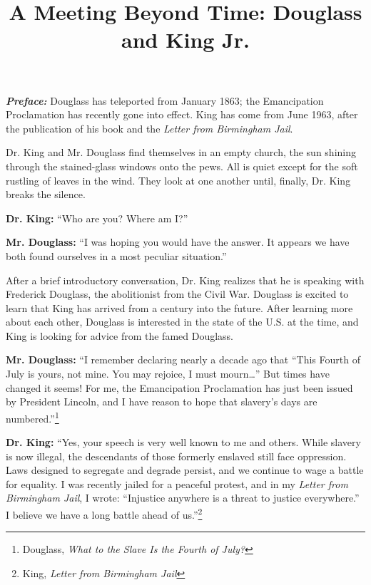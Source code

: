 \documentclass[12pt]{article}
\title{A Meeting Beyond Time: Douglass and King Jr.}
\author{}
\date{}
\begin{document}
\maketitle
\onehalfspacing

\textbf{\textit{Preface:}} Douglass has teleported from January 1863; the Emancipation Proclamation has recently gone into effect. King has come from June 1963, after the publication of his book and the \textit{Letter from Birmingham Jail}.

\bigskip

\indent Dr. King and Mr. Douglass find themselves in an empty church, the sun shining through the stained-glass windows onto the pews. All is quiet except for the soft rustling of leaves in the wind. They look at one another until, finally, Dr. King breaks the silence.

\bigskip

\textbf{Dr. King:} “Who are you? Where am I?”

\textbf{Mr. Douglass:} “I was hoping you would have the answer. It appears we have both found ourselves in a most peculiar situation.”

\bigskip

After a brief introductory conversation, Dr. King realizes that he is speaking with Frederick Douglass, the abolitionist from the Civil War. Douglass is excited to learn that King has arrived from a century into the future. After learning more about each other, Douglass is interested in the state of the U.S. at the time, and King is looking for advice from the famed Douglass.

\bigskip

\textbf{Mr. Douglass:} “I remember declaring nearly a decade ago that \enquote{This Fourth of July is yours, not mine. You may rejoice, I must mourn…} But times have changed it seems! For me, the Emancipation Proclamation has just been issued by President Lincoln, and I have reason to hope that slavery’s days are numbered.”\footnote{Douglass, \textit{What to the Slave Is the Fourth of July?}}

\textbf{Dr. King:} “Yes, your speech is very well known to me and others. While slavery is now illegal, the descendants of those formerly enslaved still face oppression. Laws designed to segregate and degrade persist, and we continue to wage a battle for equality. I was recently jailed for a peaceful protest, and in my \textit{Letter from Birmingham Jail}, I wrote: \enquote{Injustice anywhere is a threat to justice everywhere.} I believe we have a long battle ahead of us.”\footnote{King, \textit{Letter from Birmingham Jail}}
\end{document}
